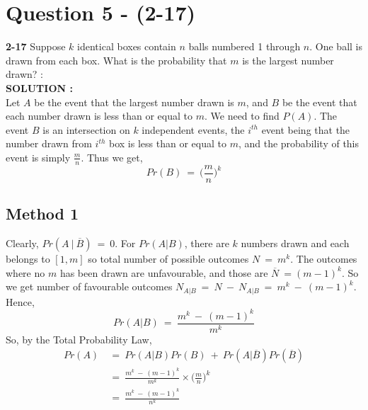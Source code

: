 \documentclass{article}
\begin{document}
\section{Question 5 - (2-17)}
\label{Q5}
\textbf{2-17}  Suppose $k$ identical boxes contain $n$ balls numbered 1 through $n$. One ball is drawn from each box. What is the probability that $m$ is the largest number drawn?  : \\

\hspace{1em} \large{\textbf{SOLUTION :}} \\
Let $A$ be the event that the largest number drawn is $m$, and $B$ be the event that each number drawn is less than or equal to $m$. We need to find $P(A)$. The event $B$ is an intersection on $k$ independent events, the $i^{th}$ event being that the number drawn from $i^{th}$ box is less than or equal to $m$, and the probability of this event is simply $\frac{m}{n}$. Thus we get,
\begin{equation*}
    Pr(B)\ =\ \Big(\frac{m}{n}\Big)^k
\end{equation*}
\subsection*{Method 1}
Clearly, $Pr(A\ |\ \overline{B})\ =\ 0$. For $Pr(A|B)$, there are $k$ numbers drawn and each belongs to $[1,m]$ so total number of possible outcomes $N\ =\ m^k$. The outcomes where no $m$ has been drawn are unfavourable, and those are $\overline{N}\ = (m-1)^k$. So we get number of favourable outcomes $N_{A|B}\ =\ N\ -\ N_{A|B}\ =\ m^k\ -\ (m-1)^k$. Hence, 
\begin{equation*}
    Pr(A|B)\ = \ \frac{m^k\ -\ (m-1)^k}{m^k}
\end{equation*}
So, by the Total Probability Law,
\begin{equation*}
\begin{split}
Pr(A)\ &= \ Pr(A|B)Pr(B)\ +\ Pr(A|\overline{B})Pr(\overline{B}) \\
       &= \ \frac{m^k\ -\ (m-1)^k}{m^k} \times \Big(\frac{m}{n}\Big)^k \\
       &= \ \frac{m^k\ -\ (m-1)^k}{n^k}
\end{split}
\end{equation*}
\end{document}
